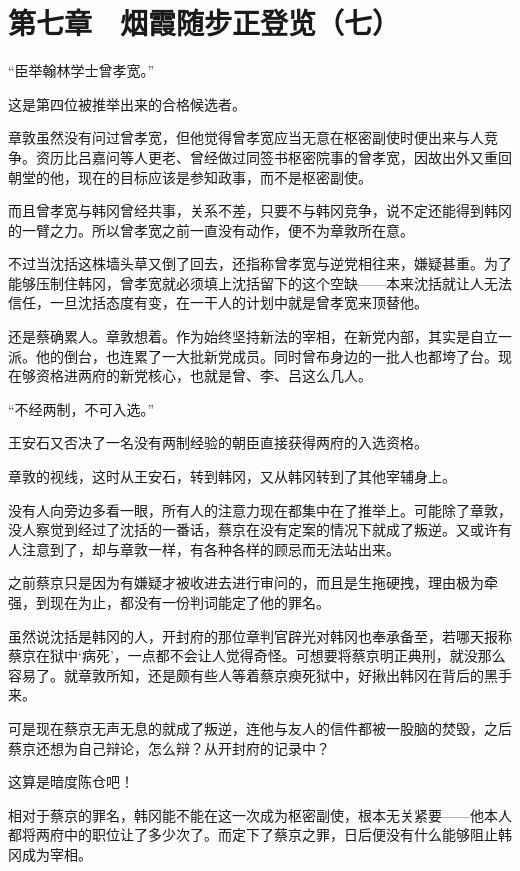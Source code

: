 \section{第七章　烟霞随步正登览（七）}

“臣举翰林学士曾孝宽。”

这是第四位被推举出来的合格候选者。

章敦虽然没有问过曾孝宽，但他觉得曾孝宽应当无意在枢密副使时便出来与人竞争。资历比吕嘉问等人更老、曾经做过同签书枢密院事的曾孝宽，因故出外又重回朝堂的他，现在的目标应该是参知政事，而不是枢密副使。

而且曾孝宽与韩冈曾经共事，关系不差，只要不与韩冈竞争，说不定还能得到韩冈的一臂之力。所以曾孝宽之前一直没有动作，便不为章敦所在意。

不过当沈括这株墙头草又倒了回去，还指称曾孝宽与逆党相往来，嫌疑甚重。为了能够压制住韩冈，曾孝宽就必须填上沈括留下的这个空缺——本来沈括就让人无法信任，一旦沈括态度有变，在一干人的计划中就是曾孝宽来顶替他。

还是蔡确累人。章敦想着。作为始终坚持新法的宰相，在新党内部，其实是自立一派。他的倒台，也连累了一大批新党成员。同时曾布身边的一批人也都垮了台。现在够资格进两府的新党核心，也就是曾、李、吕这么几人。

“不经两制，不可入选。”

王安石又否决了一名没有两制经验的朝臣直接获得两府的入选资格。

章敦的视线，这时从王安石，转到韩冈，又从韩冈转到了其他宰辅身上。

没有人向旁边多看一眼，所有人的注意力现在都集中在了推举上。可能除了章敦，没人察觉到经过了沈括的一番话，蔡京在没有定案的情况下就成了叛逆。又或许有人注意到了，却与章敦一样，有各种各样的顾忌而无法站出来。

之前蔡京只是因为有嫌疑才被收进去进行审问的，而且是生拖硬拽，理由极为牵强，到现在为止，都没有一份判词能定了他的罪名。

虽然说沈括是韩冈的人，开封府的那位章判官辟光对韩冈也奉承备至，若哪天报称蔡京在狱中‘病死’，一点都不会让人觉得奇怪。可想要将蔡京明正典刑，就没那么容易了。就章敦所知，还是颇有些人等着蔡京瘐死狱中，好揪出韩冈在背后的黑手来。

可是现在蔡京无声无息的就成了叛逆，连他与友人的信件都被一股脑的焚毁，之后蔡京还想为自己辩论，怎么辩？从开封府的记录中？

这算是暗度陈仓吧！

相对于蔡京的罪名，韩冈能不能在这一次成为枢密副使，根本无关紧要——他本人都将两府中的职位让了多少次了。而定下了蔡京之罪，日后便没有什么能够阻止韩冈成为宰相。

